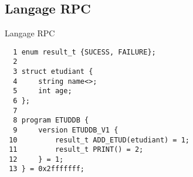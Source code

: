 \section{\sectitle}
\begin{frame}[containsverbatim]{\sectitle}
    \def\subsectitle{Langage RPC}
    \subsection{\subsectitle}
    \begin{exampleblock}{\subsectitle}
        \begin{verbatim}
  1 enum result_t {SUCESS, FAILURE};
  2 
  3 struct etudiant {
  4     string name<>;
  5     int age;
  6 };
  7 
  8 program ETUDDB {
  9     version ETUDDB_V1 {
 10         result_t ADD_ETUD(etudiant) = 1;
 11         result_t PRINT() = 2;
 12     } = 1;
 13 } = 0x2fffffff;
        \end{verbatim}
    \end{exampleblock}
\end{frame}

